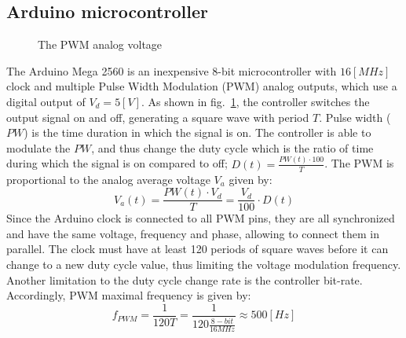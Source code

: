 \documentclass[\main/master.tex]{subfiles}
\begin{document}
\subsection{Arduino microcontroller}
\begin{figure}[htbp]
	\centering
	\caption[The PWM analog voltage]{The PWM analog voltage}
	\label{fig:duty_cycle}
\end{figure}
\par\noindent
The Arduino Mega 2560 is an inexpensive 8-bit microcontroller with $16 [MHz]$ clock and multiple Pulse Width Modulation (PWM) analog outputs, which use a digital output of $V_d = 5[V]$. As shown in fig.~\ref{fig:duty_cycle}, the controller switches the output signal on and off, generating a square wave with period $T$. Pulse width ($PW$) is the time duration in which the signal is on. The controller is able to modulate the $PW$, and thus change the duty cycle which is the ratio of time during which the signal is on compared to off; $D(t) = \frac{PW(t)\cdot 100}{T}$. The PWM is proportional to the analog average voltage $V_a$ given by: 
\begin{equation}
V_a(t) = \frac{ PW(t)\cdot V_d}{ T}  = \frac{V_d}{100}\cdot D(t)   \label{eqn:pwm voltage}
\end{equation}
Since the Arduino clock is connected to all PWM pins, they are all synchronized and have the same voltage, frequency and phase, allowing to connect them in parallel. The clock must have at least 120 periods of square waves before it can change to a new duty cycle value, thus limiting the voltage modulation frequency. Another limitation to the duty cycle change rate is the controller bit-rate. Accordingly, PWM maximal frequency is given by:
\begin{equation}
f_{PWM} = \frac{1 }{120T}= \frac{1 }{120 \frac{8-bit }{16MHz}}  \approx 500[Hz]	    \label{eqn:pwm frequency}
\end{equation}
\end{document}
